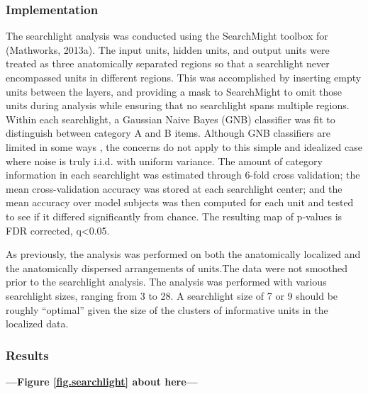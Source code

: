 \subsubsection{Implementation}
The searchlight analysis was conducted using the SearchMight toolbox \cite{pereira_information_2011} for {\matlab} (Mathworks, 2013a). The input units, hidden units, and output units were treated as three anatomically separated regions so that a searchlight never encompassed units in different regions. This was accomplished by inserting empty units between the layers, and providing a mask to SearchMight to omit those units during analysis while ensuring that no searchlight spans multiple regions. Within each searchlight, a Gaussian Naive Bayes (GNB) classifier was fit to distinguish between category A and B items. Although GNB classifiers are limited in some ways \cite{pereira_information_2011}, the concerns do not apply to this simple and idealized case where noise is truly i.i.d. with uniform variance. The amount of category information in each searchlight was estimated through 6-fold cross validation; the mean cross-validation accuracy was stored at each searchlight center; and the mean accuracy over model subjects was then computed for each unit and tested to see if it differed significantly from chance. The resulting map of p-values is FDR corrected, q<0.05.

As previously, the analysis was performed on both the anatomically localized and the anatomically dispersed arrangements of units.The data were not smoothed prior to the searchlight analysis. The analysis was performed with various searchlight sizes, ranging from 3 to 28. A searchlight size of 7 or 9 should be roughly ``optimal'' given the size of the clusters of informative units in the localized data.

\subsubsection{Results} 

\begin{center}
\textbf{---Figure \ref{fig.searchlight} about here---}
\end{center}


